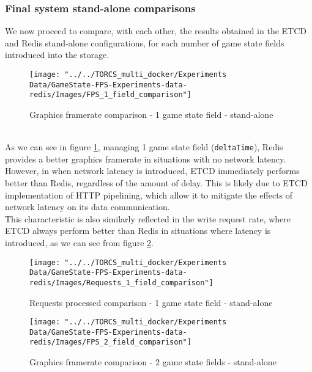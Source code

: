 \subsubsection{Final system stand-alone comparisons}
We now proceed to compare, with each other, the results obtained in the ETCD and Redis stand-alone configurations, for each number of game state fields introduced into the storage. \\
\begin{figure}[h!]
	\centering
	\texttt{[image: "../../TORCS\_multi\_docker/Experiments Data/GameState-FPS-Experiments-data-redis/Images/FPS\_1\_field\_comparison"]}
	\caption[Graphics framerate comparison - 1 game state field - stand-alone]{Graphics framerate comparison - 1 game state field - stand-alone}
	\label{fig:fps-1-field-comparison-standalone}
\end{figure}
\\ As we can see in figure \ref{fig:fps-1-field-comparison-standalone}, managing 1 game state field (\texttt{deltaTime}), Redis provides a better graphics framerate in situations with no network latency. However, in when network latency is introduced, ETCD immediately performs better than Redis, regardless of the amount of delay. This is likely due to ETCD implementation of HTTP pipelining, which allow it to mitigate the effects of network latency on its data communication. \\
This characteristic is also similarly reflected in the write request rate, where ETCD always perform better than Redis in situations where latency is introduced, as we can see from figure \ref{fig:requests-1-field-comparison-standalone}.
\begin{figure}[h!]
	\centering
	\texttt{[image: "../../TORCS\_multi\_docker/Experiments Data/GameState-FPS-Experiments-data-redis/Images/Requests\_1\_field\_comparison"]}
	\caption[Requests processed comparison - 1 game state field - stand-alone]{Requests processed comparison - 1 game state field - stand-alone}
	\label{fig:requests-1-field-comparison-standalone}
\end{figure}
\begin{figure}[h!]
	\centering
	\texttt{[image: "../../TORCS\_multi\_docker/Experiments Data/GameState-FPS-Experiments-data-redis/Images/FPS\_2\_field\_comparison"]}
	\caption[Graphics framerate comparison - 2 game state fields - stand-alone]{Graphics framerate comparison - 2 game state fields - stand-alone}
	\label{fig:fps-2-field-comparison-standalone}
\end{figure}
